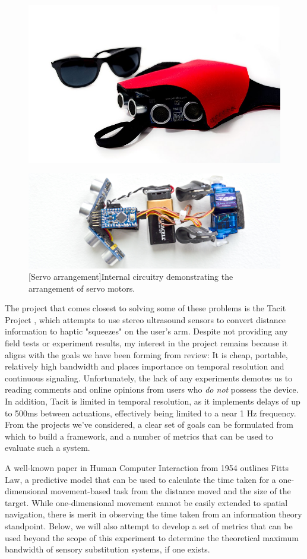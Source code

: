 \documentclass[
hidelinks,
12pt, %
oneside, %
english, %
doublespacing, %
headsepline, %
]{MastersDoctoralThesis} %
\begin{document}
\begin{figure}
\centering
\begin{minipage}{.5\textwidth}
  \centering
  \includegraphics[width=.35\linewidth]{images/tacit}
  \label{fig:tacit1}
\end{minipage}%
\begin{minipage}{.5\textwidth}
  \centering
  \includegraphics[width=.5\linewidth]{images/tacit2}
  [Servo arrangement]{Internal circuitry demonstrating the arrangement of servo motors.}
  \label{fig:tacit2}
\end{minipage}
\end{figure}

The project that comes closest to solving some of these problems is the Tacit Project \parencite{hoefer_meet_nodate}, which attempts to use stereo ultrasound sensors to convert distance information to haptic "squeezes" on the user's arm. Despite not providing any field tests or experiment results, my interest in the project remains because it aligns with the goals we have been forming from review: It is cheap, portable, relatively high bandwidth and places importance on temporal resolution and continuous signaling. Unfortunately, the lack of any experiments demotes us to reading comments and online opinions from users who \emph{do not} possess the device. In addition, Tacit is limited in temporal resolution, as it implements delays of up to 500ms between actuations, effectively being limited to a near 1 Hz frequency.
From the projects we've considered, a clear set of goals can be formulated from which to build a framework, and a number of metrics that can be used to evaluate such a system.

A well-known paper \parencite{m._fitts_information_1992} in Human Computer Interaction from 1954 outlines Fitts Law, a predictive model that can be used to calculate the time taken for a one-dimensional movement-based task from the distance moved and the size of the target. While one-dimensional movement cannot be easily extended to spatial navigation, there is merit in observing the time taken from an information theory standpoint. Below, we will also attempt to develop a set of metrics that can be used beyond the scope of this experiment to determine the theoretical maximum bandwidth of sensory substitution systems, if one exists.
\end{document}

